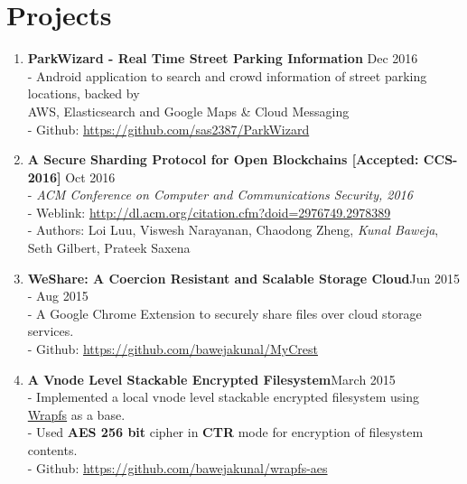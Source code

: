 \documentclass{article}
\begin{document}
\section*{Projects}

\begin{enumerate}

    \item \textbf{ParkWizard - Real Time Street Parking Information} {\hfill Dec 2016}\\
    - Android application to search and crowd information of street parking locations, backed by\\
    \hspace*{0.7em}AWS, Elasticsearch and Google Maps \& Cloud Messaging\\
    - Github: \href{https://github.com/sas2387/ParkWizard}{https://github.com/sas2387/ParkWizard}

    \item \textbf{A Secure Sharding Protocol for Open Blockchains [Accepted: CCS-2016]} {\hfill Oct 2016}\\
    - \textit{ACM Conference on Computer and Communications Security, 2016}\\
    - Weblink: \href{http://dl.acm.org/citation.cfm?doid=2976749.2978389}{http://dl.acm.org/citation.cfm?doid=2976749.2978389}\\
    - Authors: Loi Luu, Viswesh Narayanan, Chaodong Zheng, \textit{Kunal Baweja}, Seth Gilbert, Prateek Saxena

    \item \textbf{WeShare: A Coercion Resistant and Scalable Storage Cloud}{\hfill Jun 2015 - Aug 2015}\\
    - A Google Chrome Extension to securely share files over cloud storage services.\\
    - Github: \href{https://github.com/bawejakunal/MyCrest}{https://github.com/bawejakunal/MyCrest}
    
    \item \textbf{A Vnode Level Stackable Encrypted Filesystem}{\hfill March 2015}\\
    - Implemented a local vnode level stackable encrypted filesystem using \href{http://wrapfs.filesystems.org/}{Wrapfs} as a base.\\
    - Used \textbf{AES 256 bit} cipher in \textbf{CTR} mode for encryption of filesystem contents.\\
    - Github: \href{https://github.com/bawejakunal/wrapfs-aes}{https://github.com/bawejakunal/wrapfs-aes}
    

\end{enumerate}
\end{document}
